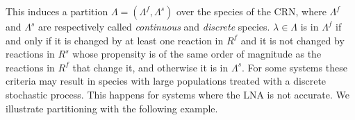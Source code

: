 \documentclass{llncs}
\begin{document}
This %
induces a partition $\Lambda=(\Lambda^{f},\Lambda^{s})$ over the species of the CRN,
where $\Lambda^f$ and $\Lambda^s$ are respectively called \emph{continuous}  and \emph{discrete} species.
 $\lambda \in \Lambda$ is in $\Lambda^f$ if and only if it is changed by at least one reaction in $R^f$ and it is not changed by reactions in $R^s$
 whose propensity is of the same order of magnitude as
 the reactions in $R^f$ that change it, and otherwise it is in $\Lambda^s$. %
 For some systems these criteria may result in species with large populations treated with a discrete %
 stochastic process. This happens for systems where the LNA is not accurate.
We illustrate partitioning with the following example.
\end{document}
